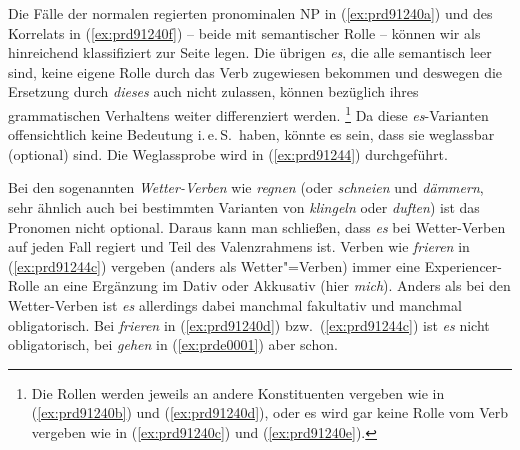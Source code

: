 \begin{exe}
\end{exe}

Die Fälle der normalen regierten pronominalen NP in (\ref{ex:prd91240a}) und des Korrelats in (\ref{ex:prd91240f}) -- beide mit semantischer Rolle -- können wir als hinreichend klassifiziert zur Seite legen.
Die übrigen \textit{es}, die alle semantisch leer sind, keine eigene Rolle durch das Verb zugewiesen bekommen und deswegen die Ersetzung durch \textit{dieses} auch nicht zulassen, können bezüglich ihres grammatischen Verhaltens weiter differenziert werden.%
\footnote{Die Rollen werden jeweils an andere Konstituenten vergeben wie in (\ref{ex:prd91240b}) und (\ref{ex:prd91240d}), oder es wird gar keine Rolle vom Verb vergeben wie in (\ref{ex:prd91240c}) und (\ref{ex:prd91240e}).}
Da diese \textit{es}-Varianten offensichtlich keine Bedeutung i.\,e.\,S.\ haben, könnte es \zB sein, dass sie weglassbar (optional) sind.
Die Weglassprobe wird in (\ref{ex:prd91244}) durchgeführt.

\begin{exe}
  \ex\label{ex:prd91244}
  \begin{xlist}
  \end{xlist}
\end{exe}


Bei den sogenannten \textit{Wetter-Verben} wie \textit{regnen} (oder \textit{schneien} und \textit{dämmern}, sehr ähnlich auch bei bestimmten Varianten von \textit{klingeln} oder \textit{duften}) ist das Pronomen nicht optional.
Daraus kann man schließen, dass \textit{es} bei Wetter-Verben auf jeden Fall regiert und Teil des Valenzrahmens ist.
Verben wie \textit{frieren} in (\ref{ex:prd91244c}) vergeben (anders als Wetter"=Verben) immer eine Experiencer-Rolle an eine Ergänzung im Dativ oder Akkusativ (hier \textit{mich}).
Anders als bei den Wetter-Verben ist \textit{es} allerdings dabei manchmal fakultativ und manchmal obligatorisch.
Bei \textit{frieren} in (\ref{ex:prd91240d}) bzw.\ (\ref{ex:prd91244c}) ist \textit{es} nicht obligatorisch, bei \textit{gehen} in (\ref{ex:prde0001}) aber schon.

\begin{exe}
  \ex\label{ex:prde0001} 
  \begin{xlist}
  \end{xlist}
\end{exe}


